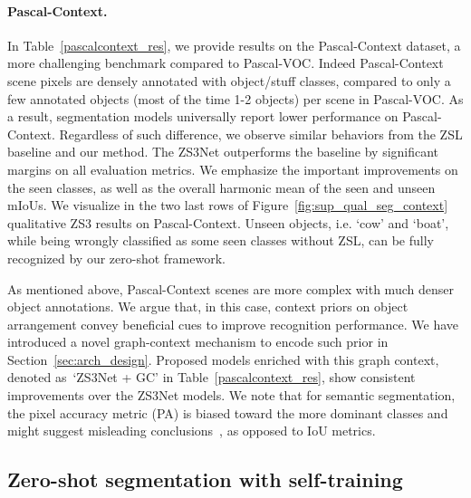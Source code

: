 \documentclass{article}
\begin{document}
\vspace{-0.3cm}


\paragraph{Pascal-Context.}
In Table~\ref{pascalcontext_res}, we provide results on the Pascal-Context dataset, a more challenging benchmark compared to Pascal-VOC.
Indeed Pascal-Context scene pixels are densely annotated with  object/stuff classes, compared to only a few annotated objects (most of the time 1-2 objects) per scene in Pascal-VOC.
As a result, segmentation models universally report lower performance on Pascal-Context.
Regardless of such difference, we observe similar behaviors from the ZSL baseline and our method.
The ZS3Net outperforms the baseline by significant margins on all evaluation metrics.
We emphasize the important improvements on the seen classes, as well as the overall harmonic mean of the seen and unseen mIoUs. We visualize in the two last rows of Figure~\ref{fig:sup_qual_seg_context} qualitative ZS3 results on Pascal-Context.
Unseen objects, i.e. `cow' and `boat', while being wrongly classified as some seen classes without ZSL, can be fully recognized by our zero-shot framework.

As mentioned above, Pascal-Context scenes are more complex with much denser object annotations.
We argue that, in this case, context priors on object arrangement convey beneficial cues to improve recognition performance.
We have introduced a novel graph-context mechanism to encode such prior in Section~\ref{sec:arch_design}.
Proposed models enriched with this graph context, denoted as~`ZS3Net + GC' in Table~\ref{pascalcontext_res}, show consistent improvements over the ZS3Net models.
We note that for semantic segmentation, the pixel accuracy metric (PA) is biased toward the more dominant classes and might suggest misleading conclusions~\cite{csurka2013good}, as opposed to IoU metrics. 


\subsection{Zero-shot segmentation with self-training}\label{sec:self_training_results}
\end{document}
